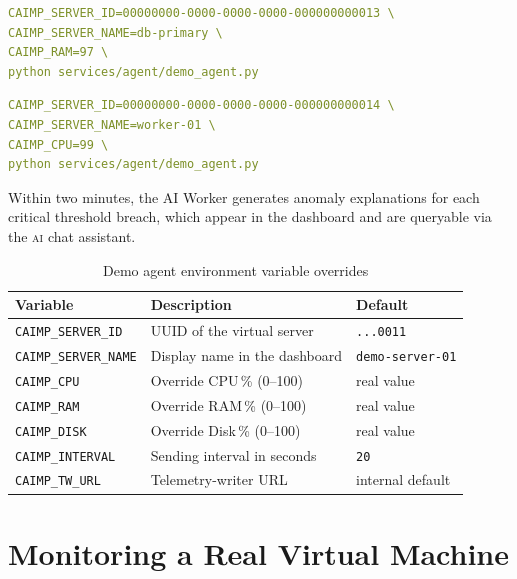 \begin{lstlisting}[language=YAML, caption={Terminal 2 — db-primary with critical RAM}]
CAIMP_SERVER_ID=00000000-0000-0000-0000-000000000013 \
CAIMP_SERVER_NAME=db-primary \
CAIMP_RAM=97 \
python services/agent/demo_agent.py
\end{lstlisting}

\begin{lstlisting}[language=YAML, caption={Terminal 3 — worker-01 with critical CPU}]
CAIMP_SERVER_ID=00000000-0000-0000-0000-000000000014 \
CAIMP_SERVER_NAME=worker-01 \
CAIMP_CPU=99 \
python services/agent/demo_agent.py
\end{lstlisting}

\noindent Within two minutes, the AI Worker generates anomaly explanations for
each critical threshold breach, which appear in the dashboard and are queryable
via the \textsc{ai} chat assistant.

\begin{table}[H]
\centering
\caption{Demo agent environment variable overrides}
\label{tab:demo-agent-vars}
\small
\begin{tabularx}{\textwidth}{lXl}
\toprule
\textbf{Variable} & \textbf{Description} & \textbf{Default} \\
\midrule
\texttt{CAIMP\_SERVER\_ID}   & UUID of the virtual server        & \texttt{...0011} \\
\texttt{CAIMP\_SERVER\_NAME} & Display name in the dashboard     & \texttt{demo-server-01} \\
\texttt{CAIMP\_CPU}          & Override CPU\,\% (0--100)         & real value \\
\texttt{CAIMP\_RAM}          & Override RAM\,\% (0--100)         & real value \\
\texttt{CAIMP\_DISK}         & Override Disk\,\% (0--100)        & real value \\
\texttt{CAIMP\_INTERVAL}     & Sending interval in seconds       & \texttt{20} \\
\texttt{CAIMP\_TW\_URL}      & Telemetry-writer URL              & internal default \\
\bottomrule
\end{tabularx}
\end{table}

\section{Monitoring a Real Virtual Machine}
\label{sec:vm-monitoring}


